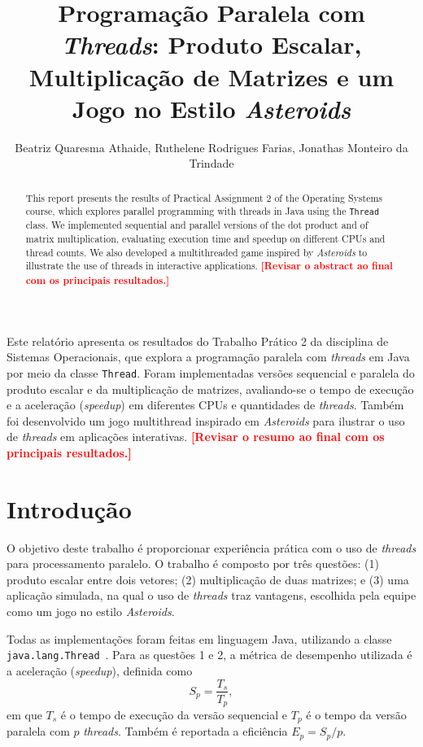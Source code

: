 \documentclass[12pt]{article}
\title{Programação Paralela com \textit{Threads}: Produto Escalar, Multiplicação de Matrizes e um Jogo no Estilo \textit{Asteroids}}
\author{Beatriz Quaresma Athaide\inst{1}, Ruthelene Rodrigues Farias\inst{1},
Jonathas Monteiro da Trindade\inst{1}\\
}
\newcommand{\todo}[1]{\textcolor{red}{\textbf{[#1]}}}
\begin{document}
\maketitle

\begin{abstract}
This report presents the results of Practical Assignment 2 of the Operating Systems course, which explores parallel programming with threads in Java using the \texttt{Thread} class. We implemented sequential and parallel versions of the dot product and of matrix multiplication, evaluating execution time and speedup on different CPUs and thread counts. We also developed a multithreaded game inspired by \textit{Asteroids} to illustrate the use of threads in interactive applications. \todo{Revisar o abstract ao final com os principais resultados.}
\end{abstract}

\begin{resumo}
Este relatório apresenta os resultados do Trabalho Prático 2 da disciplina de Sistemas Operacionais, que explora a programação paralela com \textit{threads} em Java por meio da classe \texttt{Thread}. Foram implementadas versões sequencial e paralela do produto escalar e da multiplicação de matrizes, avaliando-se o tempo de execução e a aceleração (\textit{speedup}) em diferentes CPUs e quantidades de \textit{threads}. Também foi desenvolvido um jogo multithread inspirado em \textit{Asteroids} para ilustrar o uso de \textit{threads} em aplicações interativas. \todo{Revisar o resumo ao final com os principais resultados.}
\end{resumo}

\section{Introdução}
\label{sec:intro}

O objetivo deste trabalho é proporcionar experiência prática com o uso de \textit{threads} para processamento paralelo. O trabalho é composto por três questões: (1) produto escalar entre dois vetores; (2) multiplicação de duas matrizes; e (3) uma aplicação simulada, na qual o uso de \textit{threads} traz vantagens, escolhida pela equipe como um jogo no estilo \textit{Asteroids}.

Todas as implementações foram feitas em linguagem Java, utilizando a classe \texttt{java.lang.Thread}~\cite{goetz2006,oracle-concurrency}. Para as questões 1 e 2, a métrica de desempenho utilizada é a aceleração (\textit{speedup}), definida como
\begin{equation}
S_p = \frac{T_s}{T_p},
\end{equation}
em que $T_s$ é o tempo de execução da versão sequencial e $T_p$ é o tempo da versão paralela com $p$ \textit{threads}. Também é reportada a eficiência $E_p = S_p / p$.
\end{document}
